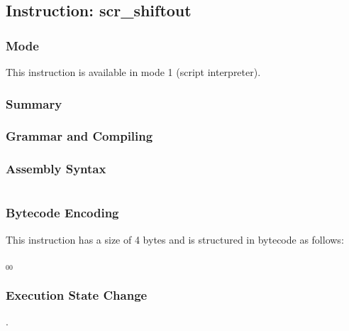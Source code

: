 \subsection{Instruction: scr\_shiftout}

\subsubsection{Mode}
This instruction is available in mode 1 (script interpreter).
\subsubsection{Summary}


\subsubsection{Grammar and Compiling}


\subsubsection{Assembly Syntax}

\begin{myquote}
\begin{verbatim}

\end{verbatim}
\end{myquote}

\subsubsection{Bytecode Encoding}

This instruction has a size of 4 bytes and is structured in bytecode as follows:

$_{00}$\ 


\subsubsection{Execution State Change}

.


